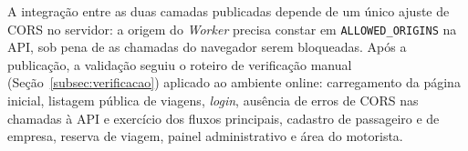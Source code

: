 A integração entre as duas camadas publicadas depende de um único ajuste de CORS no servidor: a origem do \textit{Worker} precisa constar em \texttt{ALLOWED\_ORIGINS} na API, sob pena de as chamadas do navegador serem bloqueadas. Após a publicação, a validação seguiu o roteiro de verificação manual (Seção~\ref{subsec:verificacao}) aplicado ao ambiente online: carregamento da página inicial, listagem pública de viagens, \textit{login}, ausência de erros de CORS nas chamadas à API e exercício dos fluxos principais, cadastro de passageiro e de empresa, reserva de viagem, painel administrativo e área do motorista.
